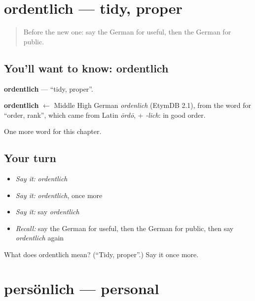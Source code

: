 \section[ordentlich]{ordentlich — tidy, proper}

\label{lesson:GE-C219-ordentlich}



\begin{quote}
Before the new one: say the German for useful, then the German for public.
\end{quote}

\subsection*{You'll want to know: ordentlich}
\textbf{ordentlich} — \textquotedblleft{}tidy, proper\textquotedblright{}.

\begin{cousinweb}
\textbf{ordentlich} $\leftarrow$ Middle High German \emph{ordenlich} (EtymDB 2.1), from the word for \textquotedblleft{}order, rank\textquotedblright{}, which came from Latin \emph{ōrdō}, + \emph{-lich}: in good order.
\end{cousinweb}

\begin{grammarlens}[title={What you've built}]
One more word for this chapter.
\end{grammarlens}

\subsection*{Your turn}
\begin{itemize}
\raggedright
  \item \emph{Say it:} \emph{ordentlich}
  \item \emph{Say it:} \emph{ordentlich}, once more
  \item \emph{Say it:} say \emph{ordentlich}
  \item \emph{Recall:} say the German for useful, then the German for public, then say \emph{ordentlich} again
\end{itemize}

\begin{tcolorbox}[breakable,colback=teal!4,colframe=teal!35!black,title={Before you move on}]
What does ordentlich mean? (\textquotedblleft{}Tidy, proper\textquotedblright{}.) Say it once more.
\end{tcolorbox}
\section[persönlich]{persönlich — personal}

